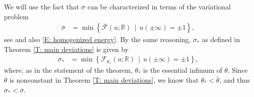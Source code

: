 \documentclass[12pt]{amsart}
\begin{document}
We will use the fact that $ \bar\sigma $ can be characterized in terms of the variational problem
%
\begin{align}
		\bar\sigma &= \min \left\{ \bar{\mathscr{F}}(u;\mathbb{R}) \, \mid \, u(\pm \infty) = \pm 1 \right\}, \label{eqn:bar-sigma}
\end{align}
%
see \cite[(3.5)]{AlbertiLectureNotes} and also \eqref{E: homogenized energy}. By the same reasoning, $ \sigma_* $ as defined in Theorem \ref{T: main deviations} is given by
%
\begin{align} \label{E: lower energy variational formula}
		\sigma_*&= \min \left\{ \mathscr{F}_{\theta_{*}}(u;\mathbb{R}) \, \mid \, u(\pm \infty) = \pm 1 \right\} ,
\end{align}
where, as in the statement of the theorem, $\theta_{*}$ is the essential infimum of $\theta$.
%
Since $\theta$ is nonconstant in Theorem \ref{T: main deviations}, we know that $ \theta_* < \bar\theta $, and thus $ \sigma_* < \bar\sigma $.
 
\end{document}
